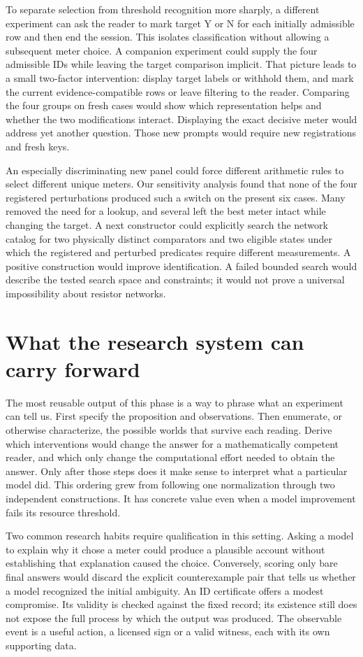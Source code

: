 \documentclass[12pt,letterpaper]{article}
\begin{document}
To separate selection from threshold recognition more sharply, a different experiment can ask the reader to mark target Y or N for each initially admissible row and then end the session. This isolates classification without allowing a subsequent meter choice. A companion experiment could supply the four admissible IDs while leaving the target comparison implicit. That picture leads to a small two-factor intervention: display target labels or withhold them, and mark the current evidence-compatible rows or leave filtering to the reader. Comparing the four groups on fresh cases would show which representation helps and whether the two modifications interact. Displaying the exact decisive meter would address yet another question. Those new prompts would require new registrations and fresh keys.

An especially discriminating new panel could force different arithmetic rules to select different unique meters. Our sensitivity analysis found that none of the four registered perturbations produced such a switch on the present six cases. Many removed the need for a lookup, and several left the best meter intact while changing the target. A next constructor could explicitly search the network catalog for two physically distinct comparators and two eligible states under which the registered and perturbed predicates require different measurements. A positive construction would improve identification. A failed bounded search would describe the tested search space and constraints; it would not prove a universal impossibility about resistor networks.

\section{What the research system can carry forward}

The most reusable output of this phase is a way to phrase what an experiment can tell us. First specify the proposition and observations. Then enumerate, or otherwise characterize, the possible worlds that survive each reading. Derive which interventions would change the answer for a mathematically competent reader, and which only change the computational effort needed to obtain the answer. Only after those steps does it make sense to interpret what a particular model did. This ordering grew from following one normalization through two independent constructions. It has concrete value even when a model improvement fails its resource threshold.

Two common research habits require qualification in this setting. Asking a model to explain why it chose a meter could produce a plausible account without establishing that explanation caused the choice. Conversely, scoring only bare final answers would discard the explicit counterexample pair that tells us whether a model recognized the initial ambiguity. An ID certificate offers a modest compromise. Its validity is checked against the fixed record; its existence still does not expose the full process by which the output was produced. The observable event is a useful action, a licensed sign or a valid witness, each with its own supporting data.
\end{document}
